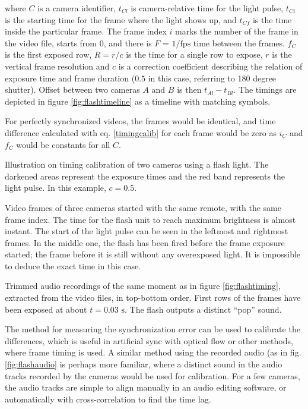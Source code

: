 where $C$ is a camera identifier, $t_{Cl}$ is camera-relative time for the light pulse, $t_{Ci}$ is the starting time for the frame where the light shows up, and $t_{Cf}$ is the time inside the particular frame.
The frame index $i$ marks the number of the frame in the video file, starts from 0, and there is $F$ = $1/\text{fps}$ time between the frames.
$f_C$ is the first exposed row, $R = r / c$ is the time for a single row to expose, $r$ is the vertical frame resolution and $c$ is a correction coefficient describing the relation of exposure time and frame duration ($0.5$ in this case, referring to 180 degree shutter).
Offset between two cameras $A$ and $B$ is then $t_{Al} - t_{Bl}$.
The timings are depicted in figure \ref{fig:flashtimeline} as a timeline with matching symbols.

For perfectly synchronized videos, the frames would be identical, and time difference calculated with eq. \ref{timingcalib} for each frame would be zero as $i_C$ and $f_C$ would be constants for all $C$.

{Illustration on timing calibration of two cameras using a flash light.
The darkened areas represent the exposure times and the red band represents the light pulse.
In this example, $c = 0.5$.
}

{Video frames of three cameras started with the same remote, with the same frame index.
The time for the flash unit to reach maximum brightness is almost instant.
The start of the light pulse can be seen in the leftmost and rightmost frames.
In the middle one, the flash has been fired before the frame exposure started;
the frame before it is still without any overexposed light.
It is impossible to deduce the exact time in this case.
}

{Trimmed audio recordings of the same moment as in figure \ref{fig:flashtiming}, extracted from the video files, in top-bottom order.
First rows of the frames have been exposed at about $t = 0.03 \text{ s}$.
The flash outputs a distinct ``pop'' sound.
}


The method for measuring the synchronization error can be used to calibrate the differences, which is useful in artificial sync with optical flow or other methods, where frame timing is used.
A similar method using the recorded audio (as in fig. \ref{fig:flashaudio} is perhaps more familiar, where a distinct sound in the audio tracks recorded by the cameras would be used for calibration.
For a few cameras, the audio tracks are simple to align manually in an audio editing software, or automatically with cross-correlation to find the time lag.

